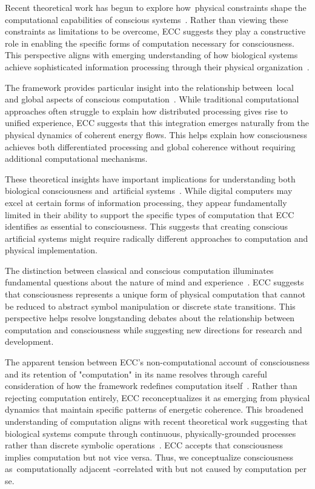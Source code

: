 Recent theoretical work has begun to explore how~physical constraints shape the computational capabilities of conscious systems~\cite{van2025processes}. Rather than viewing these constraints as limitations to be overcome, ECC suggests they play a constructive role in enabling the specific forms of computation necessary for consciousness. This perspective aligns with emerging understanding of how biological systems achieve sophisticated information processing through their physical organization~\cite{zheng2025unbearable}.

The framework provides particular insight into the relationship between~local and global aspects of conscious computation~\cite{bosl2025dynamical}. While traditional computational approaches often struggle to explain how distributed processing gives rise to unified experience, ECC suggests that this integration emerges naturally from the physical dynamics of coherent energy flows. This helps explain how consciousness achieves both differentiated processing and global coherence without requiring additional computational mechanisms.

These theoretical insights have important implications for understanding both biological consciousness and~artificial systems~\cite{seth2024conscious}. While digital computers may excel at certain forms of information processing, they appear fundamentally limited in their ability to support the specific types of computation that ECC identifies as essential to consciousness. This suggests that creating conscious artificial systems might require radically different approaches to computation and physical implementation.

The distinction between classical and conscious computation illuminates fundamental questions about the nature of mind and experience~\cite{da2024mathematical}. ECC suggests that consciousness represents a unique form of physical computation that cannot be reduced to abstract symbol manipulation or discrete state transitions. This perspective helps resolve longstanding debates about the relationship between computation and consciousness while suggesting new directions for research and development.

The apparent tension between ECC's non-computational account of consciousness and its retention of "computation" in its name resolves through careful consideration of how the framework redefines computation itself~\cite{pinotsis2023vivo}. Rather than rejecting computation entirely, ECC reconceptualizes it as emerging from physical dynamics that maintain specific patterns of energetic coherence. This broadened understanding of computation aligns with recent theoretical work suggesting that biological systems compute through continuous, physically-grounded processes rather than discrete symbolic operations~\cite{amil2024theta}. ECC accepts that consciousness implies computation but not vice versa. Thus, we conceptualize consciousness as~computationally adjacent -correlated with but not caused by computation per se.

